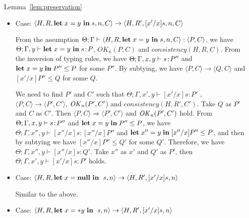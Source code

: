 \begin{pfof}{Lemma~\ref{lem:preservation}}
\begin{itemize}
  We need to find \(P'\) and \(C'\) such that \(\Theta; \Gamma
  \vdash \SKIP: P'\), \( \langle P, C \rangle \Longrightarrow \langle
  P', C' \rangle \) and \(\OK_n(P', C')\). Take \(P\) as \(P'\) and
  \(C\) as \(C'\). Then \( \langle P, C\rangle \Longrightarrow \langle
  P', C'\rangle\) holds, and then \(\OK_n(P', C')\) and
  \(consistency(H', R, C')\) hold from Lemma~\ref{lem:okPreserved} and
  Lemma~\ref{lem:consistency}. We also have \(\Theta; \Gamma
  \vdash \SKIP: P'\) from , \(0 \le P\) and .

\item Case: \( \langle H, R, \mathbf{let}\; x = y\ \mathbf{in}\; s , n, C \rangle
  \rightarrow \langle H, R', [x'/x]s, n, C \rangle \)

  From the assumption \( \Theta; \Gamma \vdash \langle H, R, \mathbf{let}\; x =
  y\ \mathbf{in}\; s, n, C \rangle : \langle P, C \rangle\), we have \(\Theta;
  \Gamma, y \vdash \mathbf{let}\; x = y \ \mathbf{in}\; s \!:\! P\), \(OK_{n}(P, C)\) and
  \(consistency(H, R, C)\). From the inversion of typing rules, we
  have \(\Theta; \Gamma, x,y \vdash s\!:\! P''\) and \( \mathbf{let}\; x = y\;
  \mathbf{in}\; P'' \le P\) for some \(P''\). By subtying, we have \( \langle P,
  C \rangle \rightarrow \langle Q, C \rangle \) and \([x'/x]P'' \le
  Q\) for some \(Q\).

  We need to find \(P'\) and \(C'\) such that \(\Theta; \Gamma,x',y
  \vdash [x'/x]s : P'\) , \( \langle P, C \rangle \rightarrow \langle
  P', C' \rangle\), \(\mathit{OK}_n(P', C'\)) and \(consistency(H, R',
  C')\). Take \(Q\) as \(P'\) and \(C\) as \(C'\). Then \( \langle P,C
  \rangle \Longrightarrow \langle P', C' \rangle\) and \(\OK_n(P',
  C')\) hold. From \(\Theta; \Gamma, x,y \vdash s\!:\! P''\) and \(
  \mathbf{let}\; x = y\; \mathbf{in}\; P'' \le P\), we have \(\Theta; \Gamma, x'',y \vdash
       [x''/x]s : [x''/x]P''\) and \( \mathbf{let}\; x'' = y\; \mathbf{in}\; [x''/x]P''
       \le P\), and then by subtying we have \([x''/x]P'' \le Q'\) for
       some \(Q'\). Therefore, we have \(\Theta; \Gamma, x'',y \vdash
       [x''/x]s : Q'\). Take \(x''\) as \(x'\) and \(Q'\) as \(P'\),
       then \(\Theta; \Gamma,x',y \vdash [x'/x]s : P'\) holds.
  
\item Case: \( \langle H, R, \LET x = \NULL \ \IN \ s, n\rangle
  \rightarrow \langle H, R', [x'/x]s, n \rangle \)

  Similar to the above.

\item Case: \( \langle H, R, \mathbf{let}\; x = *y \ \mathbf{in}\; \ s, n\rangle
  \rightarrow \langle H, R', [x'/x]s, n\rangle \)


\end{itemize}
\end{pfof}
